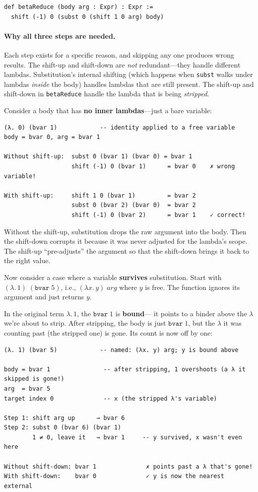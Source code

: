 \documentclass[11pt,a4paper]{article}
\theoremstyle{definition}
\newcommand{\lam}{\lambda}
\begin{document}
\begin{verbatim}
def betaReduce (body arg : Expr) : Expr :=
  shift (-1) 0 (subst 0 (shift 1 0 arg) body)
\end{verbatim}

\paragraph{Why all three steps are needed.}
Each step exists for a specific reason, and skipping any one produces wrong
results. The shift-up and shift-down are \emph{not} redundant---they handle
different lambdas. Substitution's internal shifting (which happens when
\texttt{subst} walks under lambdas \emph{inside} the body) handles lambdas
that are still present. The shift-up and shift-down in \texttt{betaReduce}
handle the lambda that is being \emph{stripped}.

Consider a body that has \textbf{no inner lambdas}---just a bare variable:

\begin{verbatim}
(λ. 0) (bvar 1)            -- identity applied to a free variable
body = bvar 0, arg = bvar 1

Without shift-up:  subst 0 (bvar 1) (bvar 0) = bvar 1
                   shift (-1) 0 (bvar 1)      = bvar 0    ✗ wrong variable!

With shift-up:     shift 1 0 (bvar 1)         = bvar 2
                   subst 0 (bvar 2) (bvar 0)  = bvar 2
                   shift (-1) 0 (bvar 2)      = bvar 1    ✓ correct!
\end{verbatim}

Without the shift-up, substitution drops the raw argument into the body. Then
the shift-down corrupts it because it was never adjusted for the lambda's
scope. The shift-up ``pre-adjusts'' the argument so that the shift-down brings
it back to the right value.

Now consider a case where a variable \textbf{survives} substitution. Start
with $(\lam.\, 1)\;(\texttt{bvar}\;5)$, i.e., $(\lam x.\, y)\;\mathit{arg}$
where $y$ is free. The function ignores its argument and just returns $y$.

In the original term $\lam.\, 1$, the $\texttt{bvar}\;1$ is \textbf{bound}---
it points to a binder above the $\lam$ we're about to strip. After stripping,
the body is just $\texttt{bvar}\;1$, but the $\lam$ it was counting past
(the stripped one) is gone. Its count is now off by one:

\begin{verbatim}
(λ. 1) (bvar 5)            -- named: (λx. y) arg; y is bound above

body = bvar 1               -- after stripping, 1 overshoots (a λ it skipped is gone!)
arg  = bvar 5
target index 0              -- x (the stripped λ's variable)

Step 1: shift arg up      → bvar 6
Step 2: subst 0 (bvar 6) (bvar 1)
        1 ≠ 0, leave it   → bvar 1     -- y survived, x wasn't even here

Without shift-down: bvar 1              ✗ points past a λ that's gone!
With shift-down:    bvar 0              ✓ y is now the nearest external
\end{verbatim}
\end{document}
